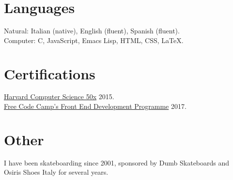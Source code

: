 \documentclass[margin,line]{resume}
\begin{document}
\begin{resume}


    \section{\mysidestyle Languages}
    Natural: Italian (native), English (fluent), Spanish (fluent).\vspace{1mm}\\%
    Computer: C, JavaScript, Emacs Lisp, HTML, CSS, \LaTeX.\vspace{-2mm}%

    \section{\mysidestyle Certifications}
    \href{https://s3.amazonaws.com/verify.edx.org/downloads/c34ff7bc0eb14dceaa26dd09d61c5dee/Certificate.pdf}{Harvard
      Computer Science 50x} 2015.\vspace{1mm}\\%
    \href{https://www.freecodecamp.org/certification/glptrst/legacy-front-end}{Free Code Camp's Front End Development Programme} 2017.\vspace{-2mm}%


    \section{\mysidestyle Other} 
    I have been skateboarding since 2001, sponsored by Dumb
    Skateboards and Osiris Shoes Italy for several
    years.



\end{resume}
\end{document}
